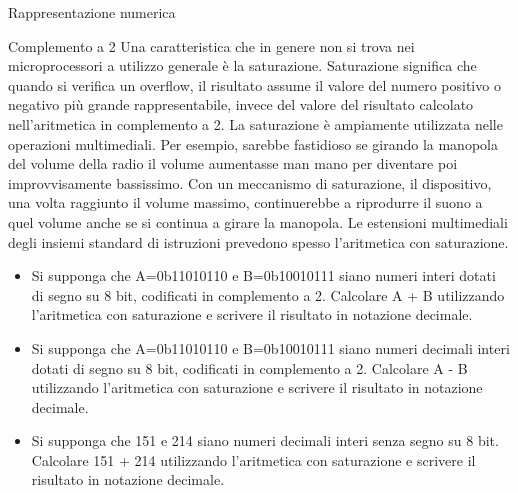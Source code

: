 \documentclass[11pt]{article}
\begin{document}
\begin{quiz}{Rappresentazione numerica}
\begin{cloze}[points=1,shuffle=false]{Complemento a 2}
Una caratteristica che in genere non si trova nei microprocessori a utilizzo generale è la saturazione. Saturazione significa che quando si
verifica un overflow, il risultato assume il valore del numero positivo o negativo più grande rappresentabile, invece del valore del risultato calcolato nell'aritmetica in complemento a 2. La saturazione è ampiamente utilizzata nelle operazioni multimediali. Per esempio, sarebbe fastidioso se girando la manopola del volume della radio il volume aumentasse man mano per diventare poi improvvisamente bassissimo. Con un meccanismo di saturazione, il dispositivo, una volta raggiunto il volume massimo, continuerebbe a riprodurre il suono a quel volume anche se si
continua a girare la manopola. Le estensioni multimediali degli insiemi standard di istruzioni prevedono spesso l'aritmetica con saturazione.

\begin{itemize}
\item Si supponga che A=0b11010110 e B=0b10010111 siano numeri interi dotati di segno su 8 bit, codificati in complemento a 2. Calcolare A + B utilizzando l'aritmetica con saturazione e scrivere il risultato in notazione decimale.
\item Si supponga che A=0b11010110 e B=0b10010111 siano numeri decimali interi dotati di segno su 8 bit, codificati in complemento a 2. Calcolare A - B utilizzando l'aritmetica con saturazione e scrivere il risultato in notazione decimale.
\item Si supponga che 151 e 214 siano numeri decimali interi senza segno su 8 bit. Calcolare 151 + 214 utilizzando l'aritmetica con saturazione e scrivere il risultato in notazione decimale.
\end{itemize}
\end{cloze}

\end{quiz}
\end{document}
